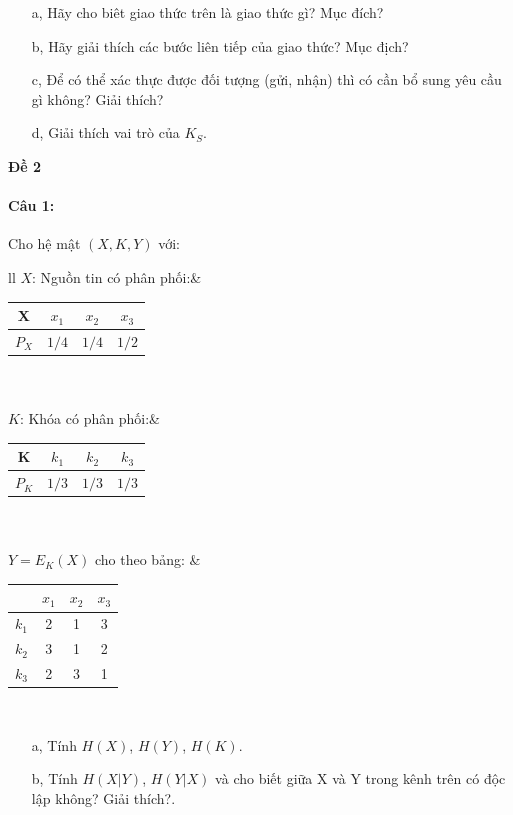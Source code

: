 \documentclass[paper=a4, fontsize=11pt]{scrartcl}
\numberwithin{equation}{section}		%
\numberwithin{figure}{section}			%
\numberwithin{table}{section}				%
\begin{document}
	\begin{itemize}
		\item[a,] Hãy cho biêt giao thức trên là giao thức gì? Mục đích?
		\item[b,] Hãy giải thích các bước liên tiếp của giao thức? Mục địch?
		\item[c,] Để có thể xác thực được đối tượng (gửi, nhận) thì có cần bổ sung yêu cầu gì không? Giải thích?
		\item[d,] Giải thích vai trò của $K_S$.
	\end{itemize}
	
	\newpage
	\textbf{Đề 2}
	
	\paragraph{Câu 1:} Cho hệ mật $(X, K, Y)$ với:\\
	\begin{tabular}{ll}
		$X$: Nguồn tin có phân phối:& 
		\begin{tabular}{|c|c|c|c|}
			\hline 
			X     & $x_1$ & $x_2$ & $x_3$\\
			\hline 
			$P_X$ & $1/4$ & $1/4$ & $1/2$\\
			\hline 
		\end{tabular} \\\\
		$K$: Khóa có phân phối:& 
		\begin{tabular}{|c|c|c|c|}
			\hline 
			K     & $k_1$ & $k_2$ & $k_3$\\
			\hline 
			$P_K$ & $1/3$ & $1/3$ & $1/3$\\
			\hline 
		\end{tabular} \\\\ 
		$Y= E_K(X)$ cho theo bảng:	
		&
		\begin{tabular}{|c|c|c|c|}
			\hline 
			& $x_1$ & $x_2$ & $x_3$\\
			\hline 
			$k_1$ & 2      & 1    & 3    \\
			\hline 
			$k_2$ & 3      & 1    & 2    \\
			\hline 
			$k_3$ & 2      & 3    & 1   \\
			\hline 
		\end{tabular}\\
	\end{tabular} 
	
	\begin{itemize}
		\item[a,] Tính $H(X)$, $H(Y)$, $H(K)$.
		\item[b,] Tính $H(X|Y)$, $H(Y|X)$ và cho biết giữa X và Y trong kênh trên có độc lập không? Giải thích?.
	\end{itemize}	
	
\end{document}
